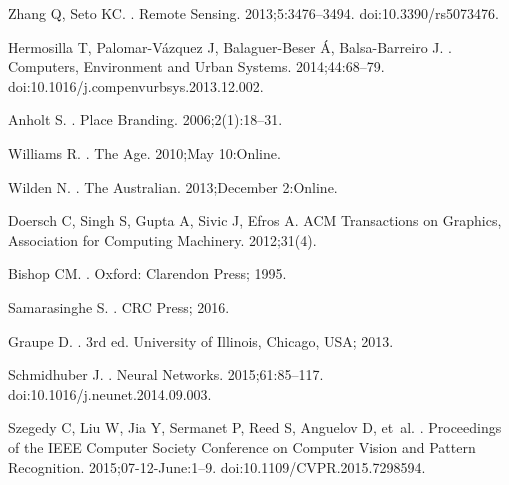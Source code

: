 Zhang Q, Seto KC.
.
\newblock Remote Sensing. 2013;5:3476--3494.
\newblock doi:{10.3390/rs5073476}.

Hermosilla T, Palomar-V{\'{a}}zquez J, Balaguer-Beser {\'{A}}, Balsa-Barreiro
  J.
.
\newblock Computers, Environment and Urban Systems. 2014;44:68--79.
\newblock doi:{10.1016/j.compenvurbsys.2013.12.002}.

Anholt S.
.
\newblock Place Branding. 2006;2(1):18--31.

Williams R.
.
\newblock The Age. 2010;May 10:Online.

Wilden N.
.
\newblock The Australian. 2013;December 2:Online.

Doersch C, Singh S, Gupta A, Sivic J, Efros A.
\newblock ACM Transactions on Graphics, Association for Computing Machinery.
  2012;31(4).



Bishop CM.
.
\newblock Oxford: Clarendon Press; 1995.

Samarasinghe S.
.
\newblock CRC Press; 2016.

Graupe D.
.
\newblock 3rd ed. University of Illinois, Chicago, USA; 2013.

Schmidhuber J.
.
\newblock Neural Networks. 2015;61:85--117.
\newblock doi:{10.1016/j.neunet.2014.09.003}.

Szegedy C, Liu W, Jia Y, Sermanet P, Reed S, Anguelov D, et~al.
.
\newblock Proceedings of the IEEE Computer Society Conference on Computer
  Vision and Pattern Recognition. 2015;07-12-June:1--9.
\newblock doi:{10.1109/CVPR.2015.7298594}.

